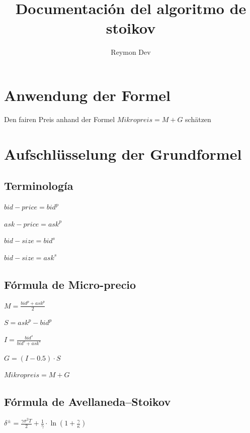 \documentclass[11pt]{article}
\begin{document}
\title{Documentación del algoritmo de stoikov}
\author{Reymon Dev}
\maketitle


\begin{abstract}
\end{abstract}


\section{Anwendung der Formel}

Den fairen Preis anhand der Formel $Mikropreis = M + G$ schätzen

\section{Aufschlüsselung der Grundformel}

\subsection{Terminología}

$bid-price = bid^p$

$ask-price = ask^p$

$bid-size  = bid^s$

$bid-size  = ask^s$

\subsection{Fórmula de Micro-precio}

$M = \frac{bid^p + ask^p}{2}$

$S = ask^p - bid^p$

$I = \frac{bid^s}{bid^s + ask^s}$

$G = \left(I - 0.5\right) \cdot S$

$Mikropreis = M + G$

\subsection{Fórmula de Avellaneda–Stoikov}

$\delta^{\pm} = \frac{\gamma \sigma^2 T}{2} + \frac{1}{\gamma} \cdot \ln\left(1 + \frac{\gamma}{\kappa}\right)$
\end{document}
